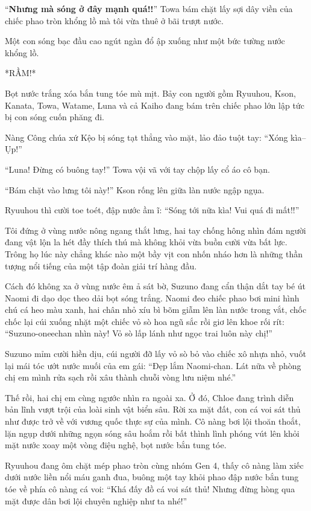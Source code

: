 \documentclass[../main.tex]{subfiles}
\begin{document}
``\textbf{Nhưng mà sóng ở đây mạnh quá!!}'' Towa bám chặt lấy sợi dây viền của chiếc phao tròn khổng lồ mà tôi vừa thuê ở bãi trượt nước.

Một con sóng bạc đầu cao ngút ngàn đổ ập xuống như một bức tường nước khổng lồ.

*RẦM!*

Bọt nước trắng xóa bắn tung tóe mù mịt. Bảy con người gồm Ryuuhou, Kson, Kanata, Towa, Watame, Luna và cả Kaiho đang bám trên chiếc phao lớn lập tức bị con sóng cuốn phăng đi.

Nàng Công chúa xứ Kệo bị sóng tạt thẳng vào mặt, lảo đảo tuột tay: ``Xóng kìa-- Ụp!''

``Luna! Đừng có buông tay!'' Towa vội vã với tay chộp lấy cổ áo cô bạn.

``Bám chặt vào lưng tôi này!'' Kson rống lên giữa làn nước ngập ngụa.

Ryuuhou thì cười toe toét, đập nước ầm ĩ: ``Sóng tới nữa kìa! Vui quá đi mất!!''

Tôi đứng ở vùng nước nông ngang thắt lưng, hai tay chống hông nhìn đám người đang vật lộn la hét đầy thích thú mà không khỏi vừa buồn cười vừa bất lực. Trông họ lúc này chẳng khác nào một bầy vịt con nhốn nháo hơn là những thần tượng nổi tiếng của một tập đoàn giải trí hàng đầu.

Cách đó không xa ở vùng nước êm ả sát bờ, Suzuno đang cẩn thận dắt tay bé út Naomi đi dạo dọc theo dải bọt sóng trắng. Naomi đeo chiếc phao bơi mini hình chú cá heo màu xanh, hai chân nhỏ xíu bì bõm giẫm lên làn nước trong vắt, chốc chốc lại cúi xuống nhặt một chiếc vỏ sò hoa ngũ sắc rồi giơ lên khoe rối rít: ``Suzuno-oneechan nhìn này! Vỏ sò lấp lánh như ngọc trai luôn này chị!''

Suzuno mỉm cười hiền dịu, cúi người đỡ lấy vỏ sò bỏ vào chiếc xô nhựa nhỏ, vuốt lại mái tóc ướt nước muối của em gái: ``Đẹp lắm Naomi-chan. Lát nữa về phòng chị em mình rửa sạch rồi xâu thành chuỗi vòng lưu niệm nhé.''

Thế rồi, hai chị em cùng ngước nhìn ra ngoài xa. Ở đó, Chloe đang trình diễn bản lĩnh vượt trội của loài sinh vật biển sâu. Rời xa mặt đất, con cá voi sát thủ như được trở về với vương quốc thực sự của mình. Cô nàng bơi lội thoăn thoắt, lặn ngụp dưới những ngọn sóng sâu hoắm rồi bất thình lình phóng vút lên khỏi mặt nước xoay một vòng điệu nghệ, bọt nước bắn tung tóe.

Ryuuhou đang ôm chặt mép phao tròn cùng nhóm Gen 4, thấy cô nàng làm xiếc dưới nước liền nổi máu ganh đua, buông một tay khỏi phao đập nước bắn tung tóe về phía cô nàng cá voi: ``Khá đấy đồ cá voi sát thủ! Nhưng đừng hòng qua mặt được dân bơi lội chuyên nghiệp như ta nhé!''
\end{document}
